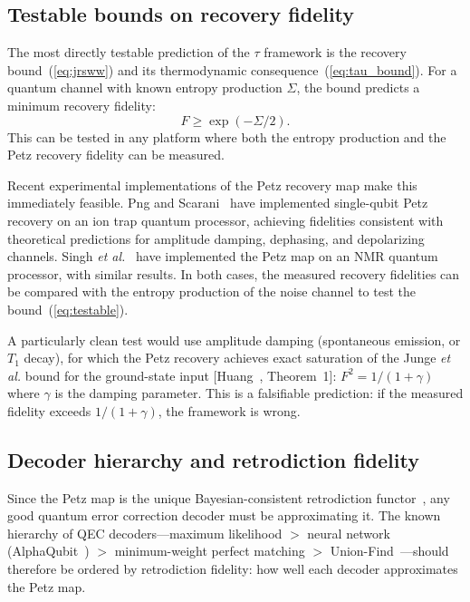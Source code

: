 \documentclass[12pt]{article}
\theoremstyle{definition}
\theoremstyle{remark}
\newcommand{\tauasym}{\tau}
\begin{document}
\subsection{Testable bounds on recovery fidelity}

The most directly testable prediction of the $\tauasym$ framework
is the recovery bound~(\ref{eq:jrsww}) and its thermodynamic
consequence~(\ref{eq:tau_bound}).  For a quantum channel with
known entropy production $\Sigma$, the bound predicts a
minimum recovery fidelity:
\begin{equation}
F \geq \exp(-\Sigma/2).
\label{eq:testable}
\end{equation}
This can be tested in any platform where both the entropy
production and the Petz recovery fidelity can be measured.

Recent experimental implementations of the Petz recovery map
make this immediately feasible.
Png and Scarani~\cite{Png2025} have implemented single-qubit
Petz recovery on an ion trap quantum processor, achieving
fidelities consistent with theoretical predictions for amplitude
damping, dephasing, and depolarizing channels.
Singh \emph{et al.}~\cite{Singh2025} have implemented the Petz
map on an NMR quantum processor, with similar results.
In both cases, the measured recovery fidelities can be compared
with the entropy production of the noise channel to test the
bound~(\ref{eq:testable}).

A particularly clean test would use amplitude damping
(spontaneous emission, or $T_1$ decay), for which the Petz
recovery achieves exact saturation of the Junge \emph{et al.}
bound for the ground-state input [Huang~\cite{Huang2026},
Theorem~1]: $F^2 = 1/(1+\gamma)$ where $\gamma$ is the damping
parameter.  This is a falsifiable prediction: if the measured
fidelity exceeds $1/(1+\gamma)$, the framework is wrong.

\subsection{Decoder hierarchy and retrodiction fidelity}

Since the Petz map is the unique Bayesian-consistent retrodiction
functor~\cite{Parzygnat2023}, any good quantum error correction
decoder must be approximating it.  The known hierarchy of QEC
decoders---maximum likelihood $>$ neural network
(AlphaQubit~\cite{Bausch2024}) $>$ minimum-weight perfect
matching $>$ Union-Find~\cite{deMartiOlius2024}---should
therefore be ordered by retrodiction fidelity: how well each
decoder approximates the Petz map.
\end{document}
